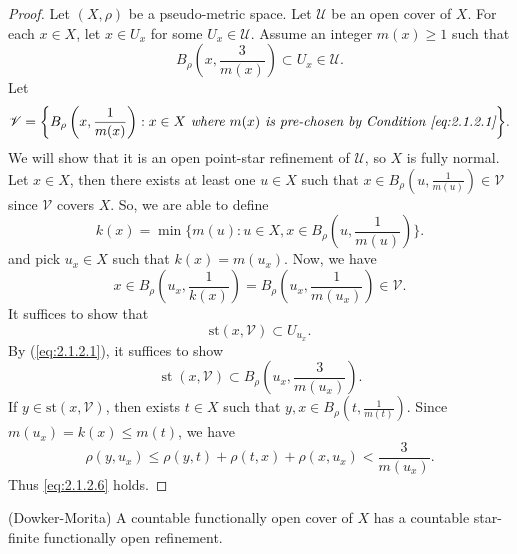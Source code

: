 \documentclass[main.tex]{subfiles}
\begin{document}
\begin{proof}
Let $(X, \rho)$ be a pseudo-metric space. Let $\mathscr{U}$ be an open cover of $X$. 
For each $x \in X$, let $x\in U_x$ for some $U_x \in \mathscr{U}$.
Assume an integer $m(x)\ge 1$ such that
\begin{equation}
 B_\rho\left(x, \frac{3}{m(x)}\right) \subset U_x\in \mathscr{U}. \label{eq:2.1.2.1}
\end{equation}
Let 
\begin{equation}
\mathscr{V} = \biggl\{
	B_\rho\left(x, \frac{1}{m(x)}\right): x\in X  \textit{ where } m(x)  
	\textit{ is pre-chosen by Condition \eqref{eq:2.1.2.1}} 
	\biggr\}.  \label{eq:2.1.2.2}
\end{equation}
We will show that it is an open point-star refinement of $\mathscr{U}$, 
	so  $X$ is fully normal. 
Let $x \in X$, then there exists at least one $u \in X$ such that
$x\in B_\rho\left(u, \frac{1}{m(u)}\right)\in\mathscr{V}$
since $\mathscr{V}$ covers $X$.
So, we are able to define
\begin{equation}
k(x) = \min\biggl\{m(u): u\in X, x\in B_\rho\left(u, \frac{1}{m(u)}\right)\biggr\}. \label{eq:2.1.2.3}
\end{equation}
and pick $u_x\in X$ such that $k(x) = m(u_x)$. Now, we have
\begin{equation}
x\in B_\rho\left(u_x, \frac{1}{k(x)}\right) 
			= B_\rho\left(u_x, \frac{1}{m(u_x)}\right)\in \mathscr{V}. \label{eq:2.1.2.4}
\end{equation}
It suffices to show that 
\begin{equation}
\mathrm{st}(x, \mathscr{V}) \subset U_{u_x}. \label{eq:2.1.2.5}
\end{equation}
By (\ref{eq:2.1.2.1}), it suffices to show
\begin{equation}
	\operatorname{st}(x, \mathscr{V}) \subset B_\rho\left(u_x, \frac{3}{m(u_x)}\right). \label{eq:2.1.2.6}
\end{equation}
If $y \in \mathrm{st}(x, \mathscr{V})$, then exists $t\in X$ 
	such that $y, x \in B_\rho\left(t, \frac{1}{m(t)}\right)$.
	Since $m(u_x)=k(x) \le m(t)$, we have
\begin{equation}
	\rho(y, u_x) \le \rho(y, t) + \rho(t, x) + \rho(x, u_x) < \frac{3}{m(u_x)}.\label{eq:2.1.2.7}
\end{equation}
Thus \eqref{eq:2.1.2.6} holds. 
\end{proof}

{\theorem{} \label{th:2.1.3}
	\textup{(Dowker-Morita)} A countable functionally open cover of $X$ 
	has a countable star-finite functionally open refinement.
}
\end{document}
